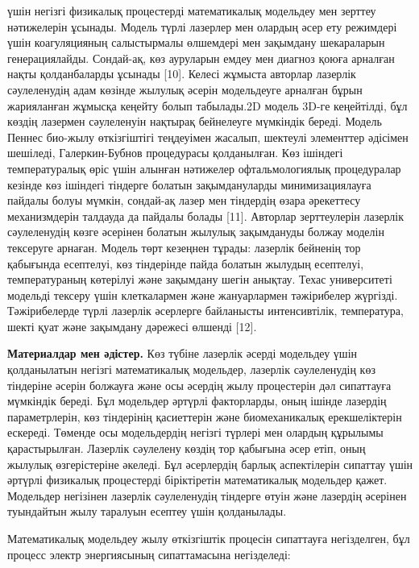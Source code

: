 \begin{multicols}{2}
үшін негізгі физикалық процестерді математикалық модельдеу мен зерттеу
нәтижелерін ұсынады. Модель түрлі лазерлер мен олардың әсер ету
режимдері үшін коагуляцияның салыстырмалы өлшемдері мен зақымдану
шекараларын генерациялайды. Сондай-ақ, көз ауруларын емдеу мен диагноз
қоюға арналған нақты қолданбаларды ұсынады {[}10{]}. Келесі жұмыста
авторлар лазерлік сәулеленудің адам көзінде жылулық әсерін модельдеуге
арналған бұрын жарияланған жұмысқа кеңейту болып табылады.2D модель
3D-ге кеңейтілді, бұл көздің лазермен сәулеленуін нақтырақ бейнелеуге
мүмкіндік береді. Модель Пеннес био-жылу өткізгіштігі теңдеуімен
жасалып, шектеулі элементтер әдісімен шешіледі, Галеркин-Бубнов
процедурасы қолданылған. Көз ішіндегі температуралық өріс үшін алынған
нәтижелер офтальмологиялық процедуралар кезінде көз ішіндегі тіндерге
болатын зақымдануларды минимизациялауға пайдалы болуы мүмкін, сондай-ақ
лазер мен тіндердің өзара әрекеттесу механизмдерін талдауда да пайдалы
болады {[}11{]}. Авторлар зерттеулерін лазерлік сәулеленудің көзге
әсерінен болатын жылулық зақымдануды болжау моделін тексеруге арнаған.
Модель төрт кезеңнен тұрады: лазерлік бейненің тор қабығында есептелуі,
көз тіндерінде пайда болатын жылудың есептелуі, температураның көтерілуі
және зақымдану шегін анықтау. Техас университеті модельді тексеру үшін
клеткалармен және жануарлармен тәжірибелер жүргізді. Тәжірибелерде түрлі
лазерлік әсерлерге байланысты интенсивтілік, температура, шекті қуат
және зақымдану дәрежесі өлшенді {[}12{]}.

{\bfseries Материалдар мен әдістер.} Көз түбіне лазерлік әсерді модельдеу
үшін қолданылатын негізгі математикалық модельдер, лазерлік сәулеленудің
көз тіндеріне әсерін болжауға және осы әсердің жылу процестерін дәл
сипаттауға мүмкіндік береді. Бұл модельдер әртүрлі факторларды, оның
ішінде лазердің параметрлерін, көз тіндерінің қасиеттерін және
биомеханикалық ерекшеліктерін ескереді. Төменде осы модельдердің негізгі
түрлері мен олардың құрылымы қарастырылған. Лазерлік сәулелену көздің
тор қабығына әсер етіп, оның жылулық өзгерістеріне әкеледі. Бұл
әсерлердің барлық аспектілерін сипаттау үшін әртүрлі физикалық
процестерді біріктіретін математикалық модельдер қажет. Модельдер
негізінен лазерлік сәулеленудің тіндерге өтуін және лазердің әсерінен
туындайтын жылу таралуын есептеу үшін қолданылады.

Математикалық модельдеу жылу өткізгіштік процесін сипаттауға
негізделген, бұл процесс электр энергиясының сипаттамасына негізделеді:
\end{multicols}

